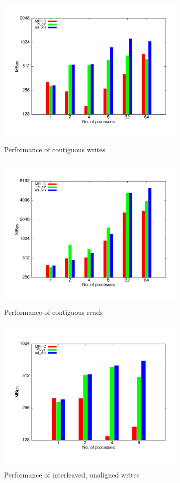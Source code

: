 \begin{figure}[!t]
\centering
\includegraphics[width=3.6in,height=3.0in]{contig_w}
\caption{Performance of contiguous writes}
\label{write_contig}
\end{figure}

\begin{figure}[!t]
\centering
\includegraphics[width=3.6in,height=3.0in]{contig_r}
\caption{Performance of contiguous reads}
\label{read_contig}
\end{figure}

\begin{figure}[!t]
\centering
\includegraphics[width=3.6in,height=3.0in]{interleaved_w}
\caption{Performance of interleaved, unaligned writes}
\label{write_interleaved}
\end{figure}

